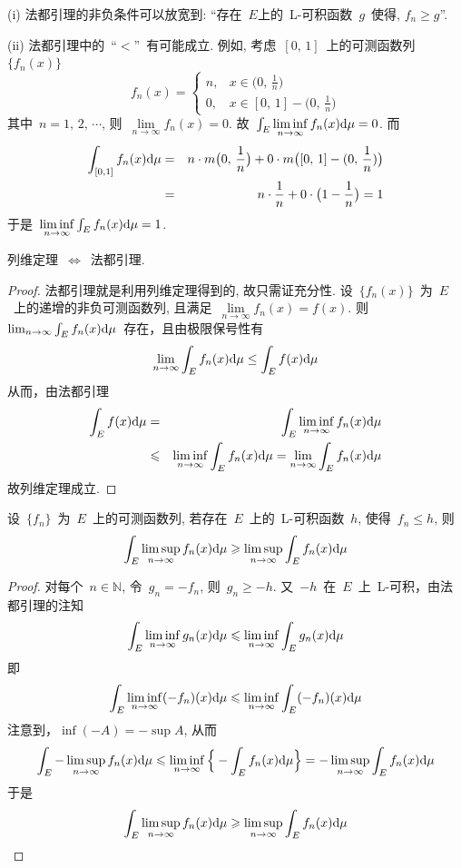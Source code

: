 \begin{remark}
(i) 法都引理的非负条件可以放宽到: ``存在~$E$上的~L-可积函数~$g$~使得, $f_n \geq g$''. 

(ii) 法都引理中的~``$<$''~有可能成立. 例如, 考虑~$[0,\, 1]$~上的可测函数列~$\{f_n(x)\}$
\[
f_n(x) = \left\{\!\!
\begin{array}{ll}
n, & x \in \big(0,\, \frac{1}{n}\big) \\[0.2cm]
0, & x \in [0,\, 1] - \big(0,\, \frac{1}{n}\big)
\end{array}
\right.
\]
其中~$n = 1,\, 2,\, \cdots$, 则~$\lim\limits_{n \to \infty} f_n(x) = 0$. 故~$\int_E \liminf\limits_{n \to \infty} f_n(x) \mathrm{d} \mu = 0$. 而
\begin{eqnarray*}
\int_{[0,1]} f_n(x) \mathrm{d} \mu &=& n \cdot m\big(0,\, \frac{1}{n}\big) + 0 \cdot m\big( [0,\, 1] - (0,\, \frac{1}{n}) \big) \\
&=& n \cdot \frac{1}{n} + 0 \cdot \big( 1 - \frac{1}{n} \big) = 1
\end{eqnarray*}
于是~$\liminf\limits_{n \to \infty} \int_E f_n(x) \mathrm{d} \mu = 1$.
\end{remark}

\begin{remark}
列维定理~$\Leftrightarrow$~法都引理.
\end{remark}

\begin{proof}
法都引理就是利用列维定理得到的, 故只需证充分性. 设~$\{f_n(x)\}$~为~$E$~上的递增的非负可测函数列, 且满足~$\lim\limits_{n \to \infty} f_n(x) = f(x)$. 则~$\lim_{n \to \infty} \int_E f_n(x)  \mathrm{d} \mu$~存在，且由极限保号性有
\[
\lim_{n \to \infty} \int_E f_n(x)  \mathrm{d} \mu \leq \int_E f(x) \mathrm{d} \mu
\]
从而，由法都引理
\begin{eqnarray*}
\int_E f(x) \mathrm{d} \mu &=& \int_E \liminf_{n \to \infty} f_n(x) \mathrm{d} \mu \\
&\leqslant& \liminf_{n \to \infty} \int_E f_n(x) \mathrm{d} \mu = \lim_{n \to \infty} \int_E f_n(x) \mathrm{d} \mu
\end{eqnarray*}
故列维定理成立.
\end{proof}

\begin{corollary} \label{cor431}
设~$\{f_n\}$~为~$E$~上的可测函数列, 若存在~$E$~上的~L-可积函数~$h$, 使得~$f_n \leqslant h$, 则
\[
\int_E \limsup_{n \to \infty} f_n(x) \mathrm{d} \mu \geqslant \limsup_{n \to \infty} \int_E f_n(x) \mathrm{d} \mu
\]
\end{corollary}

\begin{proof}
对每个~$n \in \mathbb{N}$, 令~$g_n=-f_n$, 则~$g_n \geqslant -h$. 又~$-h$~在~$E$~上~L-可积，由法都引理的注知
\[
\int_E \liminf_{n \to \infty} g_n(x) \mathrm{d} \mu \leqslant \liminf_{n \to \infty} \int_E g_n(x) \mathrm{d} \mu
\]
即
\[
\int_E \liminf_{n \to \infty} (-f_n)(x) \mathrm{d} \mu \leqslant \liminf_{n \to \infty} \int_E (-f_n)(x) \mathrm{d} \mu
\]
注意到，$\inf (-A) = - \sup A$, 从而
\[
\int_E -\limsup_{n \to \infty} f_n(x) \mathrm{d} \mu \leqslant \liminf_{n \to \infty} \Big\{-\int_E f_n(x) \mathrm{d} \mu \Big\} = - \limsup_{n \to \infty} \int_E f_n(x) \mathrm{d} \mu
\]
于是
\[
\int_E \limsup_{n \to \infty} f_n(x) \mathrm{d} \mu \geqslant \limsup_{n \to \infty} \int_E f_n(x) \mathrm{d} \mu
\]
\end{proof}

